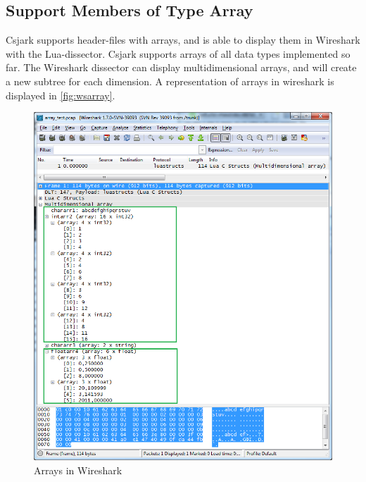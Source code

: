

\subsection{Support Members of Type Array}
Csjark supports header-files with arrays, and is able to display them in 
Wireshark with the Lua-dissector. Csjark supports arrays of all data types 
implemented so far. The Wireshark dissector can display multidimensional 
arrays, and will create a new subtree for each dimension.  A representation of 
arrays in wireshark is displayed in \autoref{fig:wsarray}.

\begin{figure}[ht]
	\center
	\includegraphics[width=\textwidth]{./sprints/img/wireshark_array}
	\caption{Arrays in Wireshark\label{fig:wsarray}}
\end{figure}

